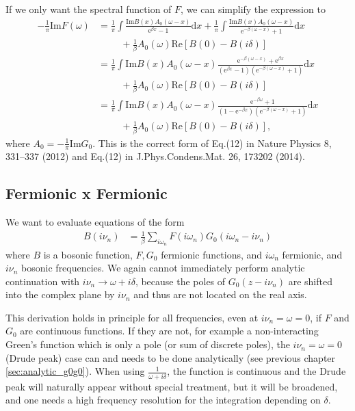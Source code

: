 \documentclass[12pt,a4paper]{scrartcl}
\numberwithin{equation}{section}
\begin{document}
If we only want the spectral function of $F$, we can simplify the expression to
\begin{align}
 -\frac{1}{\pi}\mathrm{Im}F(\omega)
 &=\frac{1}{\pi} \int \frac{\mathrm{Im}B(x) A_0(\omega - x)}{ \mathrm{e}^{\beta x} - 1 } \mathrm{d}x 
  +\frac{1}{\pi} \int \frac{\mathrm{Im}B(x) A_0(\omega - x) }{\mathrm{e}^{-\beta (\omega - x)} + 1 } \mathrm{d}x \nonumber \\
& \hspace{1cm} + \frac{1}{\beta} A_0(\omega) \mathrm{Re}\left[ B(0) - B(i\delta) \right] \\
%
&=\frac{1}{\pi} \int \mathrm{Im}B(x) A_0(\omega - x)\frac{ \mathrm{e}^{-\beta (\omega-x)} + \mathrm{e}^{\beta x}  }{\left( \mathrm{e}^{\beta x} - 1\right)\left(\mathrm{e}^{-\beta (\omega - x)} + 1 \right) } \mathrm{d}x  \nonumber \\
& \hspace{1cm} + \frac{1}{\beta} A_0(\omega) \mathrm{Re}\left[ B(0) - B(i\delta) \right] \\
%
&=\frac{1}{\pi} \int \mathrm{Im}B(x) A_0(\omega - x)\frac{ \mathrm{e}^{-\beta \omega} + 1  }{\left( 1-\mathrm{e}^{-\beta x} \right)\left(\mathrm{e}^{-\beta (\omega - x)} + 1 \right) } \mathrm{d}x  \nonumber \\
& \hspace{1cm} + \frac{1}{\beta} A_0(\omega) \mathrm{Re}\left[ B(0) - B(i\delta) \right] ,
\end{align}
where $A_0= -\frac{1}{\pi} \mathrm{Im}G_0$. This is the correct form of Eq.(12) in 
Nature Physics 8, 331–337 (2012) and Eq.(12) in  J.Phys.Condens.Mat. 26, 173202 (2014).

\subsection{Fermionic x Fermionic}
We want to evaluate equations of the form
\begin{align}
B(i\nu_n)  &= \frac{1}{\beta} \sum_{i\omega_n} F(i\omega_n) G_0(i\omega_n - i\nu_n)
\end{align}
where $B$ is a bosonic function, $F, G_0$ fermionic functions, and $i\omega_n$ fermionic, 
and $i\nu_n$ bosonic frequencies. We again cannot immediately perform 
analytic continuation with $i\nu_n \rightarrow \omega + i\delta$,
because the poles of $G_0( z - i\nu_n)$ are shifted into the complex plane by $i\nu_n$
and thus are not located on the real axis.

This derivation holds in principle for all frequencies, even at $i\nu_n = \omega = 0$,
if $F$ and $G_0$ are continuous functions.
If they are not, for example a non-interacting Green's function which is only a pole 
(or sum of discrete poles), the $i\nu_n = \omega = 0$ (Drude peak) case can and needs to be done analytically
(see previous chapter \ref{sec:analytic_g0g0}).
When using $\frac{1}{\omega + i\delta}$, the function is continuous and the Drude
peak will naturally appear without special treatment, but it will be broadened, and one 
needs a high frequency resolution for the integration depending on $\delta$.
\end{document}
